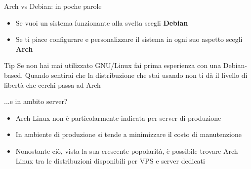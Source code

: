 \begin{frame}{Arch vs Debian: in poche parole}
    \begin{itemize}
        \item Se vuoi un sistema funzionante alla svelta scegli \textbf{Debian}
        \item Se ti piace configurare e personalizzare il sistema in ogni suo aspetto scegli \textbf{Arch}
    \end{itemize}

    
    \begin{alertblock}{Tip}
        Se non hai mai utilizzato GNU/Linux fai prima esperienza con una Debian-based. Quando sentirai
        che la distribuzione che stai usando non ti dà il livello di libertà che cerchi passa ad Arch
    \end{alertblock}
\end{frame}

\begin{frame}{...e in ambito server?}
    \begin{itemize}
        \item Arch Linux non è particolarmente indicata per server di produzione
        \item In ambiente di produzione si tende a minimizzare il costo di manutenzione
        \item Nonostante ciò, vista la sua crescente popolarità, è possibile trovare Arch Linux tra le distribuzioni disponibili per VPS e server dedicati
    \end{itemize}
\end{frame}

